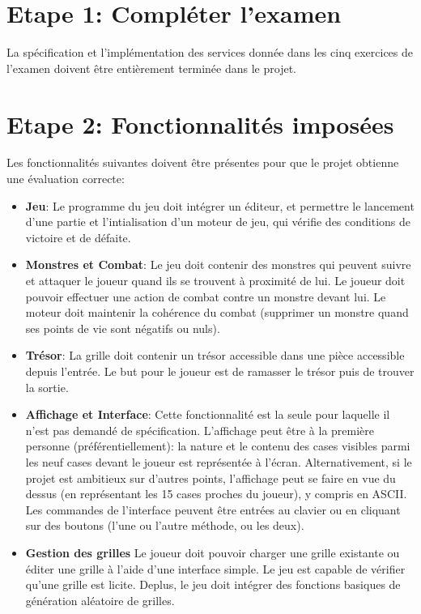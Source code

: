 \documentclass{article}
\begin{document}
\section*{Etape 1: Compléter l'examen}

La spécification et l'implémentation des services donnée dans les cinq
exercices de l'examen doivent être entièrement terminée dans le projet.

\section*{Etape 2: Fonctionnalités imposées}

Les fonctionnalités suivantes doivent être présentes pour que le
projet obtienne une évaluation correcte:
\begin{itemize}
\item \textbf{Jeu}: Le programme du jeu doit intégrer un éditeur, et
  permettre le lancement d'une partie et l'intialisation d'un moteur
  de jeu, qui vérifie des conditions de victoire et de défaite.
\item \textbf{Monstres et Combat}: Le jeu doit contenir des monstres
  qui peuvent suivre et attaquer le joueur quand ils se trouvent à
  proximité de lui. Le joueur doit pouvoir effectuer une action de
  combat contre un monstre devant lui. Le moteur doit maintenir la
  cohérence du combat (supprimer un monstre quand ses points de vie
  sont négatifs ou nuls).
\item \textbf{Trésor}: La grille doit contenir un trésor accessible
  dans une pièce accessible depuis l'entrée. Le but pour le joueur est
  de ramasser le trésor puis de trouver la sortie.
\item \textbf{Affichage et Interface}: Cette fonctionnalité est la
  seule pour laquelle il n'est pas demandé de
  spécification. L'affichage peut être à la première personne
  (préférentiellement): la nature et le contenu des cases visibles
  parmi les neuf cases devant le joueur est représentée à
  l'écran. Alternativement, si le projet est ambitieux sur d'autres
  points, l'affichage peut se faire en vue du dessus (en représentant
  les 15 cases proches du joueur), y compris en ASCII. Les commandes
  de l'interface peuvent être entrées au clavier ou en cliquant sur
  des boutons (l'une ou l'autre méthode, ou les deux).
\item \textbf{Gestion des grilles} Le joueur doit pouvoir charger une
  grille existante ou éditer une grille à l'aide d'une interface
  simple. Le jeu est capable de vérifier qu'une grille est
  licite. Deplus, le jeu doit intégrer des fonctions basiques de
  génération aléatoire de grilles.
\end{itemize}
\end{document}
